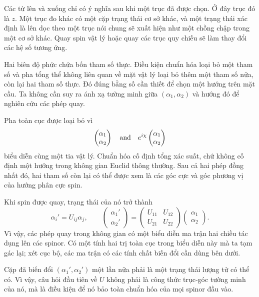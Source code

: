 Các từ {lên} và {xuống} chỉ có ý nghĩa sau khi một trục đã được chọn. Ở đây trục đó là \(z\). Một trục đo khác có một cặp trạng thái cơ sở khác, và một trạng thái xác định là lên dọc theo một trục nói chung sẽ xuất hiện như một chồng chập trong một cơ sở khác. Quay spin vật lý hoặc quay các trục quy chiếu sẽ làm thay đổi các hệ số tương ứng.

Hai biên độ phức chứa bốn tham số thực. Điều kiện chuẩn hóa loại bỏ một tham số và pha tổng thể không liên quan về mặt vật lý loại bỏ thêm một tham số nữa, còn lại hai tham số thực. Đó đúng bằng số cần thiết để chọn một hướng trên mặt cầu. Ta không cần suy ra ánh xạ tường minh giữa \((\alpha_1,\alpha_2)\) và hướng đó để nghiên cứu các phép quay.

Pha toàn cục được loại bỏ vì
\begin{equation}
\begin{pmatrix}\alpha_1\\\alpha_2\end{pmatrix}
\quad\hbox{and}\quad
e^{i\chi}
\begin{pmatrix}\alpha_1\\\alpha_2\end{pmatrix}
\end{equation}
biểu diễn cùng một tia vật lý. Chuẩn hóa cố định tổng xác suất,
chứ không cố định một hướng trong không gian Euclid thông thường. Sau cả hai phép đồng nhất đó,
hai tham số còn lại có thể được xem là các góc cực và góc phương vị của
hướng phân cực spin.

Khi spin được quay, trạng thái của nó trở thành
\begin{equation}
\alpha_i'=U_{ij}\alpha_j,
\qquad
\begin{pmatrix}\alpha_1'\\\alpha_2'\end{pmatrix}
=
\begin{pmatrix}
U_{11}&U_{12}\\
U_{21}&U_{22}
\end{pmatrix}
\begin{pmatrix}\alpha_1\\\alpha_2\end{pmatrix}.
\label{eq:l3-spinor-transform}
\end{equation}
Vì vậy, các phép quay trong không gian có một biểu diễn ma trận hai chiều tác dụng
lên các spinor. Có một tính hai trị toàn cục trong biểu diễn này mà ta tạm gác lại;
xét cục bộ, các ma trận có các tính chất biến đổi cần dùng bên dưới.

Cặp đã biến đổi \((\alpha_1',\alpha_2')\) một lần nữa phải là một trạng thái lượng tử
có thể có. Vì vậy, câu hỏi đầu tiên về \(U\) không phải là công thức trục-góc tường minh
của nó, mà là điều kiện để nó bảo toàn chuẩn hóa của mọi spinor đầu vào.

